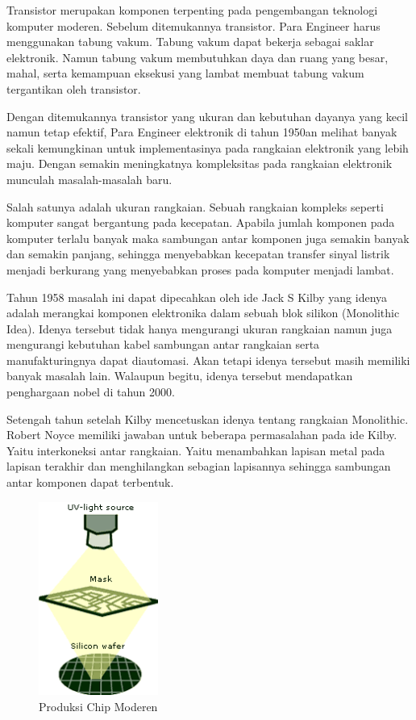 Transistor merupakan komponen terpenting pada pengembangan teknologi komputer moderen. Sebelum ditemukannya transistor. Para Engineer harus menggunakan tabung vakum. Tabung vakum dapat bekerja sebagai saklar elektronik. Namun tabung vakum membutuhkan daya dan ruang yang besar, mahal, serta kemampuan eksekusi yang lambat membuat tabung vakum tergantikan oleh transistor.

Dengan ditemukannya transistor yang ukuran dan kebutuhan dayanya yang kecil namun tetap efektif, Para Engineer elektronik di tahun 1950an melihat banyak sekali kemungkinan untuk implementasinya pada rangkaian elektronik yang lebih maju. Dengan semakin meningkatnya kompleksitas pada rangkaian elektronik munculah masalah-masalah baru.

Salah satunya adalah ukuran rangkaian. Sebuah rangkaian kompleks seperti komputer sangat bergantung pada kecepatan. Apabila jumlah komponen pada komputer terlalu banyak maka sambungan antar komponen juga semakin banyak dan semakin panjang, sehingga menyebabkan kecepatan transfer sinyal listrik menjadi berkurang yang menyebabkan proses pada komputer menjadi lambat.

Tahun 1958 masalah ini dapat dipecahkan oleh ide Jack S Kilby yang idenya adalah merangkai komponen elektronika dalam sebuah blok silikon (Monolithic Idea). Idenya tersebut tidak hanya mengurangi ukuran rangkaian namun juga mengurangi kebutuhan kabel sambungan antar rangkaian serta manufakturingnya dapat diautomasi. Akan tetapi idenya tersebut masih memiliki banyak masalah lain. Walaupun begitu, idenya tersebut mendapatkan penghargaan nobel di tahun 2000.

Setengah tahun setelah Kilby mencetuskan idenya tentang rangkaian Monolithic. Robert Noyce memiliki jawaban untuk beberapa permasalahan pada ide Kilby. Yaitu interkoneksi antar rangkaian. Yaitu menambahkan lapisan metal pada lapisan terakhir dan menghilangkan sebagian lapisannya sehingga sambungan antar komponen dapat terbentuk.

\begin{figure}
	\centering
	\includegraphics[width=0.35\textwidth]
	{pics/steping.png}
	\caption{Produksi Chip Moderen}
	\label{fig:produksiChipModeren}
\end{figure}

